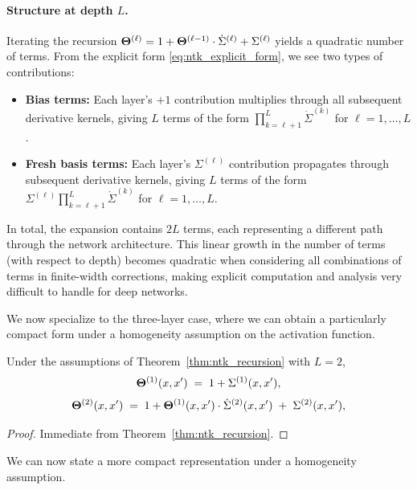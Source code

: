 \paragraph{Structure at depth \( L \).}
Iterating the recursion \( \boldsymbol{\Theta}^{(\ell)} = 1 + \boldsymbol{\Theta}^{(\ell-1)}\cdot\dot{\Sigma}^{(\ell)} + \Sigma^{(\ell)} \) yields a quadratic number of terms. From the explicit form \eqref{eq:ntk_explicit_form}, we see two types of contributions:
\begin{itemize}
    \item \textbf{Bias terms:} Each layer's \( +1 \) contribution multiplies through all subsequent derivative kernels, giving \( L \) terms of the form \( \prod_{k=\ell+1}^{L} \dot{\Sigma}^{(k)} \) for \( \ell=1,\dots,L \).
    \item \textbf{Fresh basis terms:} Each layer's \( \Sigma^{(\ell)} \) contribution propagates through subsequent derivative kernels, giving \( L \) terms of the form \( \Sigma^{(\ell)}\prod_{k=\ell+1}^{L}\dot{\Sigma}^{(k)} \) for \( \ell=1,\dots,L \).
\end{itemize}
In total, the expansion contains \( 2L \) terms, each representing a different path through the network architecture. This linear growth in the number of terms (with respect to depth) becomes quadratic when considering all combinations of terms in finite-width corrections, making explicit computation and analysis very difficult to handle for deep networks.

\vspace{0.4cm}
We now specialize to the three-layer case, where we can obtain a particularly compact form under a homogeneity assumption on the activation function.

\begin{corollary}\label{cor:two_layer_ntk}
Under the assumptions of Theorem~\ref{thm:ntk_recursion} with \( L=2 \),
\[
\boldsymbol{\Theta}^{(1)}(x,x') \;=\; 1 + \Sigma^{(1)}(x,x'),
\]
\[
\boldsymbol{\Theta}^{(2)}(x,x') \;=\; 1 + \boldsymbol{\Theta}^{(1)}(x,x')\cdot\dot{\Sigma}^{(2)}(x,x') \;+\; \Sigma^{(2)}(x,x'),
\]
\end{corollary}

\begin{proof}
\label{proof:two_layer_ntk_inline}
Immediate from Theorem~\ref{thm:ntk_recursion}.
\end{proof}




\vspace{0.3cm}
We can now state a more compact representation under a homogeneity assumption. 
\vspace{0.3cm}


